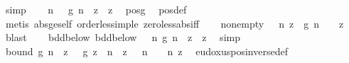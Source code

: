 \begin{isabellebody}
\ simp\isanewline
\isanewline
\ \ \isamarkupfalse%
\ {\isachardoublequoteopen}{\isasymexists}n\ {\isasymge}\ {}{\isachardot}{\kern0pt}\ g\ n\ {\isasymge}\ {\isasymbar}z{\isasymbar}{\isachardoublequoteclose}\ \ z\ \isamarkupfalse%
\ pos{\isacharunderscore}{\kern0pt}g\ \isamarkupfalse%
\ pos{\isacharunderscore}{\kern0pt}def\ \isamarkupfalse%
\ {\isacharparenleft}{\kern0pt}metis\ abs{\isacharunderscore}{\kern0pt}ge{\isacharunderscore}{\kern0pt}self\ order{\isacharunderscore}{\kern0pt}less{\isacharunderscore}{\kern0pt}imp{\isacharunderscore}{\kern0pt}le\ zero{\isacharunderscore}{\kern0pt}less{\isacharunderscore}{\kern0pt}abs{\isacharunderscore}{\kern0pt}iff{\isacharparenright}{\kern0pt}\isanewline
\ \ \isamarkupfalse%
\ nonempty{\isacharunderscore}{\kern0pt}{\isasymphi}{\isacharcolon}{\kern0pt}\ {\isachardoublequoteopen}{\isacharbraceleft}{\kern0pt}{}{\isachardot}{\kern0pt}{\isachardot}{\kern0pt}{\isacharbraceright}{\kern0pt}\ {\isasyminter}\ {\isacharbraceleft}{\kern0pt}n{\isachardot}{\kern0pt}\ {\isasymbar}z{\isasymbar}\ {\isasymle}\ g\ n{\isacharbraceright}{\kern0pt}\ {\isasymnoteq}\ {\isacharbraceleft}{\kern0pt}{\isacharbraceright}{\kern0pt}{\isachardoublequoteclose}\ \ z\ \isamarkupfalse%
\ blast\isanewline
\ \ \isamarkupfalse%
\ bdd{\isacharunderscore}{\kern0pt}below{\isacharunderscore}{\kern0pt}{\isasymphi}{\isacharcolon}{\kern0pt}\ {\isachardoublequoteopen}bdd{\isacharunderscore}{\kern0pt}below\ {\isacharparenleft}{\kern0pt}{\isacharbraceleft}{\kern0pt}{}{\isachardot}{\kern0pt}{\isachardot}{\kern0pt}{\isacharbraceright}{\kern0pt}\ {\isasyminter}\ {\isacharbraceleft}{\kern0pt}n{\isachardot}{\kern0pt}\ g\ n\ {\isasymge}\ {\isasymbar}z{\isasymbar}{\isacharbraceright}{\kern0pt}{\isacharparenright}{\kern0pt}{\isachardoublequoteclose}\ \ z\ \isamarkupfalse%
\ simp\isanewline
\ \ \isamarkupfalse%
\ {\isasymphi}{\isacharunderscore}{\kern0pt}bound{\isacharcolon}{\kern0pt}\ {\isachardoublequoteopen}g\ n\ {\isasymge}\ z\ {\isasymLongrightarrow}\ {\isacharquery}{\kern0pt}{\isasymphi}\ g\ z\ {\isasymle}\ n{\isachardoublequoteclose}\ \ {\isachardoublequoteopen}z\ {\isasymge}\ {}{\isachardoublequoteclose}\ {\isachardoublequoteopen}n\ {\isasymge}\ {}{\isachardoublequoteclose}\ \ n\ z\ \isamarkupfalse%
\ eudoxus{\isacharunderscore}{\kern0pt}pos{\isacharunderscore}{\kern0pt}inverse{\isacharunderscore}{\kern0pt}def\ \isamarkupfalse%

\end{isabellebody}

